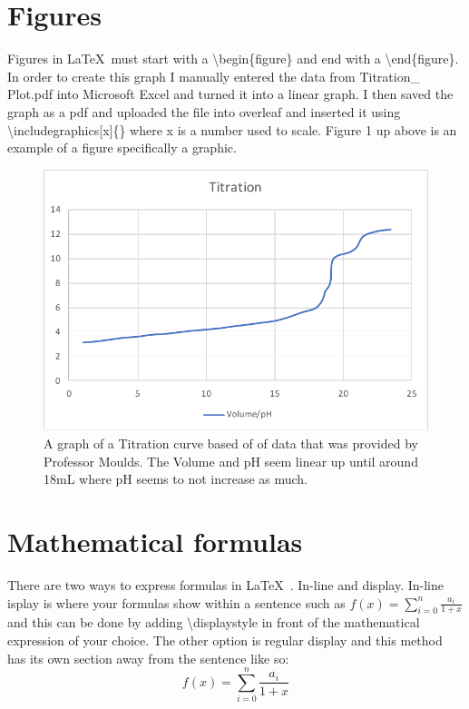 \documentclass[12pt,journal,compsoc]{IEEEtran}
\begin{document}
\section{Figures}
Figures in \LaTeX\ must start with a \textbackslash{begin\{figure\}} and end with a \textbackslash{end\{figure\}}. In order to create this graph I manually entered the data from Titration\_ Plot.pdf into Microsoft Excel and turned it into a linear graph. I then saved the graph as a pdf and uploaded the file into overleaf and inserted it using \textbackslash{includegraphics[x]\{\}} where x is a number used to scale. Figure 1 up above is an example of a figure specifically a graphic.

\begin{center}
    \begin{figure}[h]
        \includegraphics[scale = 0.45]{Graph.pdf}
        \caption{A graph of a Titration curve based of of data that was provided by Professor Moulds. The Volume and pH seem linear up until around 18mL where pH seems to not increase as much.}
        \label{titration}
    \end{figure}
\end{center}



\section{Mathematical formulas}
There are two ways to express formulas in \LaTeX\ . In-line and display.  In-line isplay is where your formulas show within a sentence such as \( f(x) = \sum_{i=0}^{n} \frac{a_i}{1+x} \) and this can be done by adding \textbackslash{displaystyle} in front of the mathematical expression of your choice. The other option is regular display and this method has its own section away from the sentence like so:
\begin{equation}
     f(x) = \sum_{i=0}^{n} \frac{a_i}{1+x} 
\end{equation}
\end{document}
